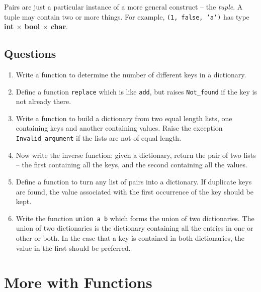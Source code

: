\documentclass[]{book}
\begin{document}
Pairs are just a particular instance of a more general construct -- the \textit{tuple}. A tuple may contain two or more things. For example, \texttt{(1, false, 'a')} has type \textsf{\textbf{int $\times$ bool $\times$ char}}. 

\clearpage
\section*{Questions}

\begin{enumerate}
\item Write a function to determine the number of different keys in a dictionary.

\item Define a function \texttt{replace} which is like \texttt{add}, but raises \texttt{Not\_found} if the key is not already there.

\item Write a function to build a dictionary from two equal length lists, one containing keys and another containing values. Raise the exception \texttt{Invalid\_argument} if the lists are not of equal length.

\item Now write the inverse function: given a dictionary, return the pair of two lists -- the first containing all the keys, and the second containing all the values.

\item Define a function to turn any list of pairs into a dictionary. If duplicate keys are found, the value associated with the first occurrence of the key should be kept.

\item Write the function \texttt{union a b} which forms the union of two dictionaries. The union of two dictionaries is the dictionary containing all the entries in one or other or both. In the case that a key is contained in both dictionaries, the value in the first should be preferred. 

\end{enumerate}


\cleardoublepage
\thispagestyle{empty}


\pagestyle{empty}



\chapter{More with Functions}
\pagestyle{fancy}
\end{document}
